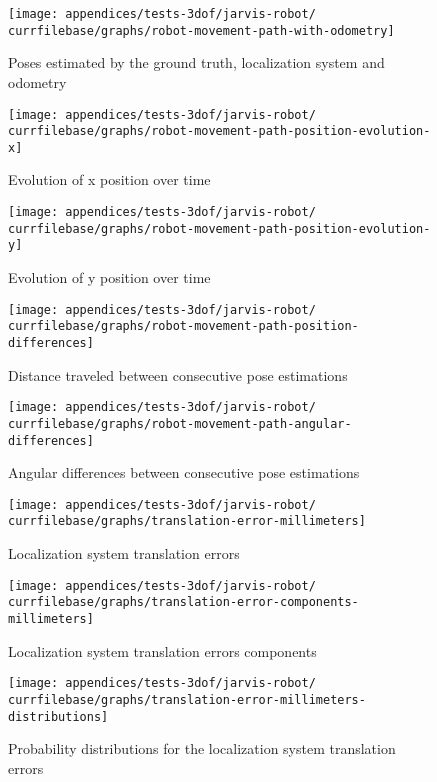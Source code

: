 \begin{figure}[H]
	\centering
	\texttt{[image: appendices/tests-3dof/jarvis-robot/\\currfilebase/graphs/robot-movement-path-with-odometry]}
	\caption{Poses estimated by the ground truth, localization system and odometry}
\end{figure}

\begin{figure}[H]
	\centering
	\texttt{[image: appendices/tests-3dof/jarvis-robot/\\currfilebase/graphs/robot-movement-path-position-evolution-x]}
	\caption{Evolution of x position over time}
\end{figure}

\begin{figure}[H]
	\centering
	\texttt{[image: appendices/tests-3dof/jarvis-robot/\\currfilebase/graphs/robot-movement-path-position-evolution-y]}
	\caption{Evolution of y position over time}
\end{figure}


\begin{figure}[H]
	\centering
	\texttt{[image: appendices/tests-3dof/jarvis-robot/\\currfilebase/graphs/robot-movement-path-position-differences]}
	\caption{Distance traveled between consecutive pose estimations}
\end{figure}


\begin{figure}[H]
	\centering
	\texttt{[image: appendices/tests-3dof/jarvis-robot/\\currfilebase/graphs/robot-movement-path-angular-differences]}
	\caption{Angular differences between consecutive pose estimations}
\end{figure}


\begin{figure}[H]
	\centering
	\texttt{[image: appendices/tests-3dof/jarvis-robot/\\currfilebase/graphs/translation-error-millimeters]}
	\caption{Localization system translation errors}
\end{figure}


\begin{figure}[H]
	\centering
	\texttt{[image: appendices/tests-3dof/jarvis-robot/\\currfilebase/graphs/translation-error-components-millimeters]}
	\caption{Localization system translation errors components}
\end{figure}


\begin{figure}[H]
	\centering
	\texttt{[image: appendices/tests-3dof/jarvis-robot/\\currfilebase/graphs/translation-error-millimeters-distributions]}
	\caption{Probability distributions for the localization system translation errors}
\end{figure}



